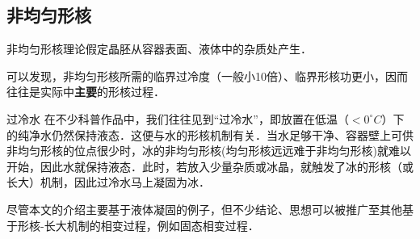 \subsection{非均匀形核}
非均匀形核理论假定晶胚从容器表面、液体中的杂质处产生．

可以发现，非均匀形核所需的临界过冷度（一般小10倍）、临界形核功更小，因而往往是实际中\textbf{主要}的形核过程．

\begin{example}{过冷水}
在不少科普作品中，我们往往见到“过冷水”，即放置在低温（$<0 ^\circ C$）下的纯净水仍然保持液态．这便与水的形核机制有关．当水足够干净、容器壁上可供非均匀形核的位点很少时，冰的非均匀形核(均匀形核远远难于非均匀形核)就难以开始，因此水就保持液态．此时，若放入少量杂质或冰晶，就触发了冰的形核（或长大）机制，因此过冷水马上凝固为冰．
\end{example}

尽管本文的介绍主要基于液体凝固的例子，但不少结论、思想可以被推广至其他基于形核-长大机制的相变过程，例如固态相变过程．
